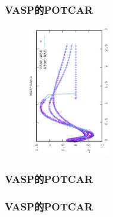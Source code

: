 {\frame
{
	\frametitle{\rm{VASP}的\rm{POTCAR}}
\begin{minipage}{0.58\textwidth}
\centering
\vspace{-0.10in}
\fontsize{3.3pt}{1.9pt}\selectfont{
}
\end{minipage}
\hfill
\begin{minipage}{0.40\textwidth}
\begin{figure}[t!]
\centering
\vspace{-0.05in}
\includegraphics[height=2.25in,width=1.4in,viewport=0 0 350 550, angle=-90, clip]{Figures/WAE-data.eps}
\label{Wave-AE_Function}
\end{figure}
\end{minipage}
}

\frame
{
	\frametitle{\rm{VASP}的\rm{POTCAR}}
\centering
\vspace{-0.15in}
\fontsize{3.3pt}{1.9pt}\selectfont{
}
}

\frame
{
	\frametitle{\rm{VASP}的\rm{POTCAR}}
\centering
\vspace{-0.15in}
\fontsize{3.3pt}{1.9pt}\selectfont{
}
}

}
